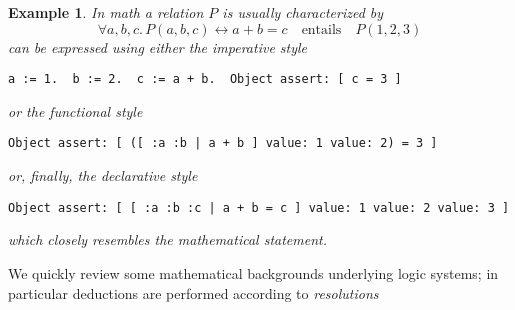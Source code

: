 \documentclass[a4paper,12pt]{article}
\newtheorem{example}[theorem]{Example}
\begin{document}
\begin{example}
In math a relation $P$ is usually characterized by
\begin{displaymath}
\forall a,b,c.\,P(a,b,c) \leftrightarrow a + b = c \quad\text{entails}\quad P(1,2,3)
\end{displaymath}
can be expressed using either the \textit{imperative style}
\begin{verbatim}
a := 1.  b := 2.  c := a + b.  Object assert: [ c = 3 ]
\end{verbatim}
or the \textit{functional style}
\begin{verbatim}
Object assert: [ ([ :a :b | a + b ] value: 1 value: 2) = 3 ]
\end{verbatim}
or, finally, the \textit{declarative style}
\begin{verbatim}
Object assert: [ [ :a :b :c | a + b = c ] value: 1 value: 2 value: 3 ]
\end{verbatim}
which closely resembles the mathematical statement.
\end{example}

We quickly review some mathematical backgrounds underlying logic systems;
in particular deductions are performed according to \emph{resolutions}
\end{document}
